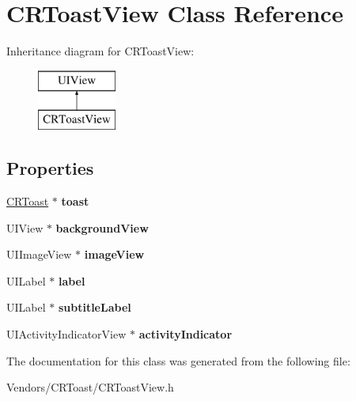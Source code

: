 \hypertarget{interface_c_r_toast_view}{}\section{C\+R\+Toast\+View Class Reference}
\label{interface_c_r_toast_view}
Inheritance diagram for C\+R\+Toast\+View\+:\begin{figure}[H]
\begin{center}
\leavevmode
\includegraphics[height=2.000000cm]{interface_c_r_toast_view}
\end{center}
\end{figure}
\subsection*{Properties}
\begin{DoxyCompactItemize}
\item 
\hypertarget{interface_c_r_toast_view_a8280f49fa959c4870acaf119de06848d}{}\hyperlink{interface_c_r_toast}{C\+R\+Toast} $\ast$ {\bfseries toast}\label{interface_c_r_toast_view_a8280f49fa959c4870acaf119de06848d}

\item 
\hypertarget{interface_c_r_toast_view_a59381f1808cee9d0edcceaa0e8f3cc59}{}U\+I\+View $\ast$ {\bfseries background\+View}\label{interface_c_r_toast_view_a59381f1808cee9d0edcceaa0e8f3cc59}

\item 
\hypertarget{interface_c_r_toast_view_a9e8f661a187dd2ac8bd9b8b8674fb834}{}U\+I\+Image\+View $\ast$ {\bfseries image\+View}\label{interface_c_r_toast_view_a9e8f661a187dd2ac8bd9b8b8674fb834}

\item 
\hypertarget{interface_c_r_toast_view_a02fa68a9f0a5d97931126a3ce61761d6}{}U\+I\+Label $\ast$ {\bfseries label}\label{interface_c_r_toast_view_a02fa68a9f0a5d97931126a3ce61761d6}

\item 
\hypertarget{interface_c_r_toast_view_a1e7984738bd20573612f0db463e703d1}{}U\+I\+Label $\ast$ {\bfseries subtitle\+Label}\label{interface_c_r_toast_view_a1e7984738bd20573612f0db463e703d1}

\item 
\hypertarget{interface_c_r_toast_view_ab54495386fac6bcfedf915c2cadb7527}{}U\+I\+Activity\+Indicator\+View $\ast$ {\bfseries activity\+Indicator}\label{interface_c_r_toast_view_ab54495386fac6bcfedf915c2cadb7527}

\end{DoxyCompactItemize}


The documentation for this class was generated from the following file\+:\begin{DoxyCompactItemize}
\item 
Vendors/\+C\+R\+Toast/C\+R\+Toast\+View.\+h\end{DoxyCompactItemize}
